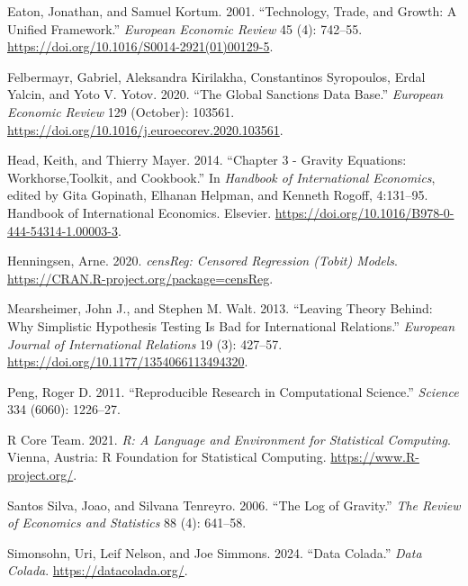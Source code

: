 \documentclass[12pt]{article}
\newlength{\cslhangindent}
\newenvironment{CSLReferences}[2] %
 {\begin{list}{}{%
  \setlength{\itemindent}{0pt}
  \setlength{\leftmargin}{0pt}
  \setlength{\parsep}{0pt}
  \ifodd #1
   \setlength{\leftmargin}{\cslhangindent}
   \setlength{\itemindent}{-1\cslhangindent}
  \fi
  \setlength{\itemsep}{#2\baselineskip}}}
 {\end{list}}
\begin{document}
\label{refs}
\begin{CSLReferences}{1}{0}
Eaton, Jonathan, and Samuel Kortum. 2001. {``Technology, Trade, and
Growth: {A} Unified Framework.''} \emph{European Economic Review} 45
(4): 742--55. \url{https://doi.org/10.1016/S0014-2921(01)00129-5}.

Felbermayr, Gabriel, Aleksandra Kirilakha, Constantinos Syropoulos,
Erdal Yalcin, and Yoto V. Yotov. 2020. {``The Global Sanctions Data
Base.''} \emph{European Economic Review} 129 (October): 103561.
\url{https://doi.org/10.1016/j.euroecorev.2020.103561}.

Head, Keith, and Thierry Mayer. 2014. {``Chapter 3 - {Gravity}
{Equations}: {Workhorse},{Toolkit}, and {Cookbook}.''} In \emph{Handbook
of {International} {Economics}}, edited by Gita Gopinath, Elhanan
Helpman, and Kenneth Rogoff, 4:131--95. Handbook of {International}
{Economics}. Elsevier.
\url{https://doi.org/10.1016/B978-0-444-54314-1.00003-3}.

Henningsen, Arne. 2020. \emph{{censReg: Censored Regression (Tobit)
Models}}. \url{https://CRAN.R-project.org/package=censReg}.

Mearsheimer, John J., and Stephen M. Walt. 2013. {``Leaving Theory
Behind: {Why} Simplistic Hypothesis Testing Is Bad for {International}
{Relations}.''} \emph{European Journal of International Relations} 19
(3): 427--57. \url{https://doi.org/10.1177/1354066113494320}.

Peng, Roger D. 2011. {``Reproducible Research in Computational
Science.''} \emph{Science} 334 (6060): 1226--27.

R Core Team. 2021. \emph{R: A Language and Environment for Statistical
Computing}. Vienna, Austria: R Foundation for Statistical Computing.
\url{https://www.R-project.org/}.

Santos Silva, Joao, and Silvana Tenreyro. 2006. {``The Log of
Gravity.''} \emph{The Review of Economics and Statistics} 88 (4):
641--58.

Simonsohn, Uri, Leif Nelson, and Joe Simmons. 2024. {``Data {Colada}.''}
\emph{Data Colada}. \url{https://datacolada.org/}.


\end{CSLReferences}
\end{document}
